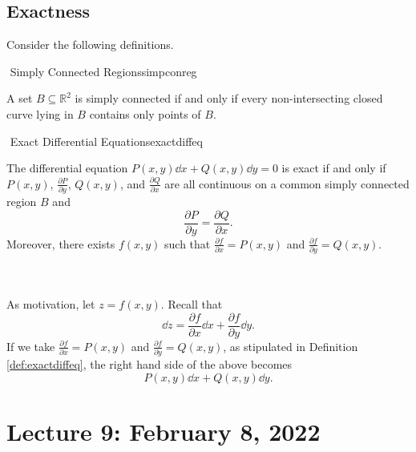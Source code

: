     \pagebreak

    \subsection{Exactness}

        Consider the following definitions.
        \begin{definition}{\Stop\,\,Simply Connected Regions}{simpconreg}

            A set \(B\subseteq\mathbb{R}^2\) is simply connected if and only if every non-intersecting closed curve lying in \(B\) contains only points of \(B\).
            
        \end{definition}
        \begin{definition}{\Stop\,\,Exact Differential Equations}{exactdiffeq}

            The differential equation \(P(x,y)\dd x+Q(x,y)\dd y=0\) is exact if and only if \(P(x,y)\), \(\frac{\partial P}{\partial y}\), \(Q(x,y)\), and \(\frac{\partial Q}{\partial x}\) are all continuous on a common simply connected region \(B\) and
            \begin{equation*}
                \frac{\partial P}{\partial y}=\frac{\partial Q}{\partial x}.
            \end{equation*}
            Moreover, there exists \(f(x,y)\) such that \(\frac{\partial f}{\partial x}=P(x,y)\) and \(\frac{\partial f}{\partial y}=Q(x,y)\).
        \end{definition}
        \vphantom
        \\
        \\
        As motivation, let \(z=f(x,y)\). Recall that
        \begin{equation*}
            \dd z=\frac{\partial f}{\partial x}\dd x+\frac{\partial f}{\partial y}\dd y.
        \end{equation*}
        If we take \(\frac{\partial f}{\partial x}=P(x,y)\) and \(\frac{\partial f}{\partial y}=Q(x,y)\), as stipulated in Definition \ref{def:exactdiffeq}, the right hand side of the above becomes
        \begin{equation*}
            P(x,y)\dd x+Q(x,y)\dd y.
        \end{equation*}

    \pagebreak

\section{Lecture 9: February 8, 2022}

